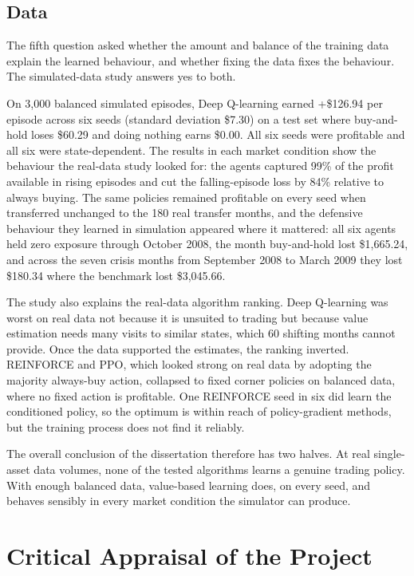\subsection{Data}

The fifth question asked whether the amount and balance of the training
data explain the learned behaviour, and whether fixing the data fixes
the behaviour. The simulated-data study answers yes to both.

On 3,000 balanced simulated episodes, Deep Q-learning earned +\$126.94
per episode across six seeds (standard deviation \$7.30) on a test set
where buy-and-hold loses \$60.29 and doing nothing earns \$0.00. All six
seeds were profitable and all six were state-dependent. The results in
each market condition show the behaviour the real-data study looked for: the agents
captured 99\% of the profit available in rising episodes and cut the
falling-episode loss by 84\% relative to always buying. The same
policies remained profitable on every seed when transferred unchanged to
the 180 real transfer months, and the defensive behaviour they learned
in simulation appeared where it mattered: all six agents held zero
exposure through October 2008, the month buy-and-hold lost \$1,665.24,
and across the seven crisis months from September 2008 to March 2009
they lost \$180.34 where the benchmark lost \$3,045.66.

The study also explains the real-data algorithm ranking. Deep
Q-learning was worst on real data not because it is unsuited to trading
but because value estimation needs many visits to similar states, which
60 shifting months cannot provide. Once the data supported the
estimates, the ranking inverted. REINFORCE and PPO, which looked strong
on real data by adopting the majority always-buy action, collapsed to
fixed corner policies on balanced data, where no fixed action is
profitable. One REINFORCE seed in six did learn the conditioned policy,
so the optimum is within reach of policy-gradient methods, but the
training process does not find it reliably.

The overall conclusion of the dissertation therefore has two halves. At
real single-asset data volumes, none of the tested algorithms learns a
genuine trading policy. With enough balanced data, value-based learning
does, on every seed, and behaves sensibly in every market condition the
simulator can produce.

\section{Critical Appraisal of the Project}

